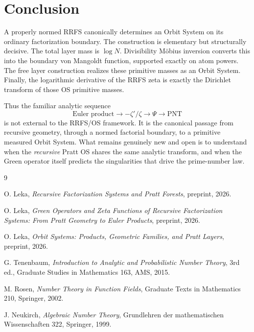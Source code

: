 \documentclass[11pt]{article}
\begin{document}
\section{Conclusion}

A properly normed RRFS canonically determines an Orbit System on its ordinary factorization boundary. The construction is elementary but structurally decisive. The total layer mass is $\log N$. Divisibility M\"obius inversion converts this into the boundary von Mangoldt function, supported exactly on atom powers. The free layer construction realizes these primitive masses as an Orbit System. Finally, the logarithmic derivative of the RRFS zeta is exactly the Dirichlet transform of those OS primitive masses.

Thus the familiar analytic sequence
\[
\text{Euler product}
\longrightarrow
-\zeta'/\zeta
\longrightarrow
\Psi
\longrightarrow
\mathrm{PNT}
\]
is not external to the RRFS/OS framework. It is the canonical passage from recursive geometry, through a normed factorial boundary, to a primitive measured Orbit System. What remains genuinely new and open is to understand when the \emph{recursive} Pratt OS shares the same analytic transform, and when the Green operator itself predicts the singularities that drive the prime-number law.

\begin{thebibliography}{9}

O. Leka,
\emph{Recursive Factorization Systems and Pratt Forests}, preprint, 2026.

O. Leka,
\emph{Green Operators and Zeta Functions of Recursive Factorization Systems: From Pratt Geometry to Euler Products}, preprint, 2026.

O. Leka,
\emph{Orbit Systems: Products, Geometric Families, and Pratt Layers}, preprint, 2026.

G. Tenenbaum,
\emph{Introduction to Analytic and Probabilistic Number Theory},
3rd ed., Graduate Studies in Mathematics 163, AMS, 2015.

M. Rosen,
\emph{Number Theory in Function Fields},
Graduate Texts in Mathematics 210, Springer, 2002.

J. Neukirch,
\emph{Algebraic Number Theory},
Grundlehren der mathematischen Wissenschaften 322, Springer, 1999.

\end{thebibliography}
\end{document}
